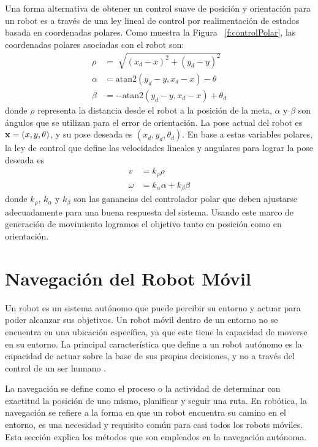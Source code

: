 Una forma alternativa de obtener un control suave de posici\'on y orientaci\'on para un robot es a trav\'es de una ley lineal de control por realimentaci\'on de estados basada en coordenadas polares. Como muestra la Figura ~\ref{f:controlPolar}, las coordenadas polares asociadas con el robot son:
\begin{align*}
\rho &= \sqrt[]{(x_{d} - x)^2 + (y_{d} - y)^2} \\
\alpha &= \text{atan2}(y_{d} - y, x_{d} - x) - \theta \\
\beta &= -\text{atan2}(y_{d} - y, x_{d} - x) + \theta_{d}
\end{align*}
donde $\rho$ representa la distancia desde el robot a la posici\'on de la meta, $\alpha$ y $\beta$ son \'angulos que se utilizan para el error de orientaci\'on. La pose actual del robot es $\mathbf x=(x,y,\theta)$, y su pose deseada es $(x_{d},y_{d},\theta_{d})$. En base a estas variables polares, la ley de control que define las velocidades lineales y angulares para lograr la pose deseada es 
\begin{align}
\label{eqn:v}
v &= k_{\rho}\rho \\
\label{eqn:w}
\omega &= k_{\alpha}\alpha + k_{\beta}\beta
\end{align}
donde $k_{\rho}$, $k_{\alpha}$ y $k_{\beta}$ son las ganancias del controlador polar que deben ajustarse adecuadamente para una buena respuesta del sistema. Usando este marco de generaci\'on de movimiento logramos el objetivo tanto en posici\'on como en orientaci\'on.

\section{Navegaci\'on del Robot M\'ovil}

Un robot es un sistema aut\'onomo que puede percibir su entorno y actuar para poder alcanzar sus objetivos. Un robot m\'ovil dentro de un entorno no se encuentra en una ubicaci\'on espec\'ifica, ya que este tiene la capacidad de moverse en su entorno. La principal caracter\'istica que define a un robot aut\'onomo es la capacidad de actuar sobre la base de sus propias decisiones, y no a trav\'es del control de un ser humano \cite{mataric2007robotics}.

La navegaci\'on se define como el proceso o la actividad de determinar con exactitud la posici\'on de uno mismo, planificar y seguir una ruta. En rob\'otica, la navegaci\'on se refiere a la forma en que un robot encuentra su camino en el entorno, es una necesidad y requisito com\'un para casi todos los robots m\'oviles. Esta secci\'on explica los m\'etodos que son empleados en la navegaci\'on aut\'onoma.

